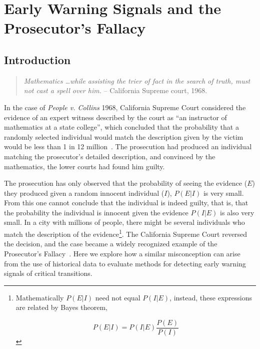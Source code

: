 

\chapter{Early Warning Signals and the Prosecutor's Fallacy}

\section{Introduction}

\begin{quotation}
\noindent \emph{Mathematics \dots while assisting the trier of fact in the search of truth, must not cast a spell over him.}
-- California Supreme court, 1968.
\end{quotation}

\noindent In the case of \emph{People v. Collins} 1968, California Supreme
Court considered the evidence of an expert witness described by the
court as ``an instructor of mathematics at a state college'', which
concluded that the probability that a randomly selected individual
would match the description given by the victim would be less than 1 in
12 million~\citep{PeopleCollins1968}.  The prosecution had produced an
individual matching the prosecutor's detailed description, and convinced
by the mathematics, the lower courts had found him
guilty.


The prosecution has only observed that the probability of seeing the
evidence ($E$) they produced given a random innocent individual ($I$),
$P(E|I)$ is very small.  From this one cannot conclude that the individual
is indeed guilty, that is, that the probability the individual is innocent
given the evidence $P(I|E)$ is also very small. In a city with millions
of people, there might be several individuals who match the description
of the evidence\footnote{Mathematically $P(E|I)$ need not equal $P(I|E)$,
instead, these expressions are related by Bayes theorem,

\begin{equation}
  P(E|I) = P(I|E) \frac{P(E)}{P(I)}
\end{equation} 

}. The California Supreme Court reversed the decision, and
the case became a widely recognized example of the Prosecutor's
Fallacy~\citep{Thompson1987}.  Here we explore how a similar misconception
can arise from the use of historical data to evaluate methods for
detecting early warning signals of critical transitions.



